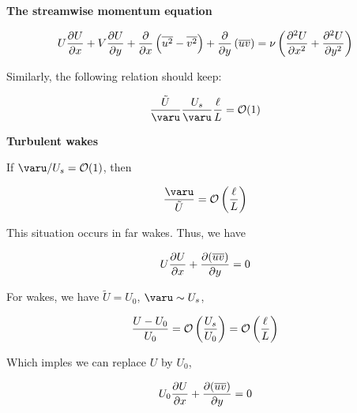 \documentclass{article}
\begin{document}
\textbf{The streamwise momentum equation}

\begin{equation*}
    U\frac{\p U}{\p x}+V\frac{\p U}{\p y}+\frac{\p}{\p x}\left(\overline{u^2}-\overline{v^2}\right)+\frac{\p}{\p y}\left(\overline{uv}\right)=\nu\left(\frac{\p^2 U}{\p x^2}+\frac{\p^2 U}{\p y^2}\right)
\end{equation*}

Similarly, the following relation should keep:

\begin{equation*}
    \frac{\tilde{U}}{\varu}\frac{U_s}{\varu}\frac{\ell}{L}=\Order(1)
\end{equation*}

\textbf{Turbulent wakes}

If $\varu/U_s=\Order(1)$, then

\begin{equation*}
    \frac{\varu}{\tilde{U}}=\Order\left(\frac{\ell}{L}\right)
\end{equation*}

This situation occurs in far wakes. Thus, we have

\begin{equation*}
    U\frac{\mathop{}\!\partial U}{\mathop{}\!\partial x}+\frac{\mathop{}\!\partial(\overline{uv})}{\mathop{}\!\partial y}=0
\end{equation*}

For wakes, we have $\tilde{U}=U_0$, $\varu\sim U_s$,

\begin{equation*}
    \frac{U-U_0}{U_0}=\mathcal{O}\left(\frac{U_s}{U_0}\right)=\mathcal{O}\left(\frac{\ell}{L}\right)
\end{equation*}

Which imples we can replace $U$ by $U_0$,

\begin{equation*}
    U_0\frac{\mathop{}\!\partial U}{\mathop{}\!\partial x}+\frac{\mathop{}\!\partial(\overline{uv})}{\mathop{}\!\partial y}=0
\end{equation*}










\ifx\allfiles\undefined         %
\end{document}
